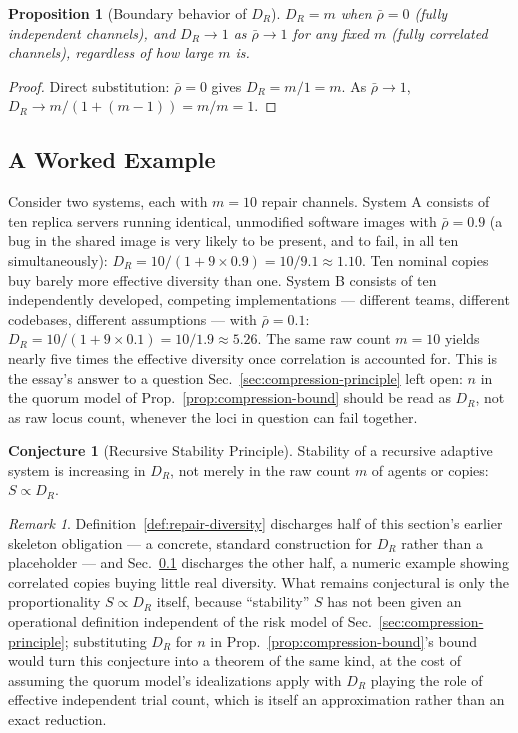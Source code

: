 \documentclass[11pt,a4paper]{article}
\theoremstyle{plain}
\newtheorem{proposition}[theorem]{Proposition}
\theoremstyle{definition}
\newtheorem{conjecture}[theorem]{Conjecture}
\theoremstyle{remark}
\newtheorem{remark}[theorem]{Remark}
\newcommand{\DR}{D_R}
\begin{document}
\begin{proposition}[Boundary behavior of $\DR$]
\label{prop:dr-boundary}
$\DR = m$ when $\bar\rho = 0$ (fully independent channels), and $\DR \to 1$ as $\bar\rho \to 1$ for any fixed $m$ (fully correlated channels), regardless of how large $m$ is.
\end{proposition}

\begin{proof}
Direct substitution: $\bar\rho=0$ gives $\DR = m/1 = m$. As $\bar\rho \to 1$, $\DR \to m/(1+(m-1)) = m/m = 1$.
\end{proof}

\subsection{A Worked Example}
\label{subsec:dr-worked-example}

Consider two systems, each with $m=10$ repair channels. System A consists of ten replica servers running identical, unmodified software images with $\bar\rho = 0.9$ (a bug in the shared image is very likely to be present, and to fail, in all ten simultaneously): $\DR = 10/(1+9\times0.9) = 10/9.1 \approx 1.10$. Ten nominal copies buy barely more effective diversity than one. System B consists of ten independently developed, competing implementations — different teams, different codebases, different assumptions — with $\bar\rho = 0.1$: $\DR = 10/(1+9\times0.1) = 10/1.9 \approx 5.26$. The same raw count $m=10$ yields nearly five times the effective diversity once correlation is accounted for. This is the essay's answer to a question Sec.~\ref{sec:compression-principle} left open: $n$ in the quorum model of Prop.~\ref{prop:compression-bound} should be read as $\DR$, not as raw locus count, whenever the loci in question can fail together.

\begin{conjecture}[Recursive Stability Principle]
\label{conj:stability}
Stability of a recursive adaptive system is increasing in $\DR$, not merely in the raw count $m$ of agents or copies: $S \propto \DR$.
\end{conjecture}

\begin{remark}
Definition~\ref{def:repair-diversity} discharges half of this section's earlier skeleton obligation — a concrete, standard construction for $\DR$ rather than a placeholder — and Sec.~\ref{subsec:dr-worked-example} discharges the other half, a numeric example showing correlated copies buying little real diversity. What remains conjectural is only the proportionality $S \propto \DR$ itself, because ``stability'' $S$ has not been given an operational definition independent of the risk model of Sec.~\ref{sec:compression-principle}; substituting $\DR$ for $n$ in Prop.~\ref{prop:compression-bound}'s bound would turn this conjecture into a theorem of the same kind, at the cost of assuming the quorum model's idealizations apply with $\DR$ playing the role of effective independent trial count, which is itself an approximation rather than an exact reduction.
\end{remark}
\end{document}
